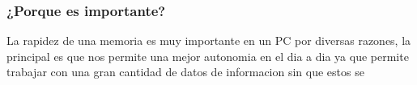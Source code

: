 \documentclass{article}
\begin{document}
\subsubsection{¿Porque es importante?}
La rapidez de una memoria es muy importante en un PC por diversas razones, la principal es que nos permite una mejor autonomia en el dia a dia ya que permite trabajar con una gran cantidad de datos de informacion sin que estos se





\end{document}
